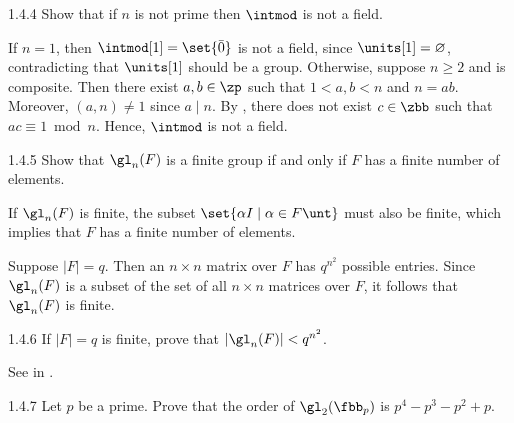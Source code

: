 \begin{exercise}{1.4.4}
    Show that if $n$ is not prime then $\intmod$ is not a field.
\end{exercise}

\begin{sol}
    If $n = 1$, then $\intmod[1] = \set{\bar 0}$ is not a field, since $\units[1] = \varnothing$, contradicting that $\units[1]$ should be a group.
	Otherwise, suppose $n \geq 2$ and is composite.
	Then there exist $a, b \in \zp$ such that $1 < a, b < n$ and $n = ab$.
	Moreover, $(a, n) \neq 1$ since $a \mid n$.
	By , there does not exist $c \in \zbb$ such that $ac \equiv 1 \bmod n$.
	Hence, $\intmod$ is not a field.
\end{sol}

\begin{exercise}{1.4.5}
    Show that $\gl_n(F)$ is a finite group if and only if $F$ has a finite number of elements.
\end{exercise}

\begin{soliff}
    \rightimp If $\gl_n(F)$ is finite, the subset $\set{\alpha I \mid \alpha\in F\unt}$ must also be finite, which implies that $F$ has a finite number of elements.

    \leftimp Suppose $|F| = q$.
	Then an $n \times n$ matrix over $F$ has $q^{n^2}$ possible entries.
	Since $\gl_n(F)$ is a subset of the set of all $n \times n$ matrices over $F$, it follows that $\gl_n(F)$ is finite.
\end{soliff}

\begin{exercise}{1.4.6}
    If $|F| = q$ is finite, prove that $|\gl_n(F)| < q^{n^2}$.
\end{exercise}

\begin{sol}
    See \leftimp in .
\end{sol}

\begin{exercise}{1.4.7}
    Let $p$ be a prime.
	Prove that the order of $\gl_2(\fbb_p)$ is $p^4 - p^3 - p^2 + p$.
    

\end{exercise}

